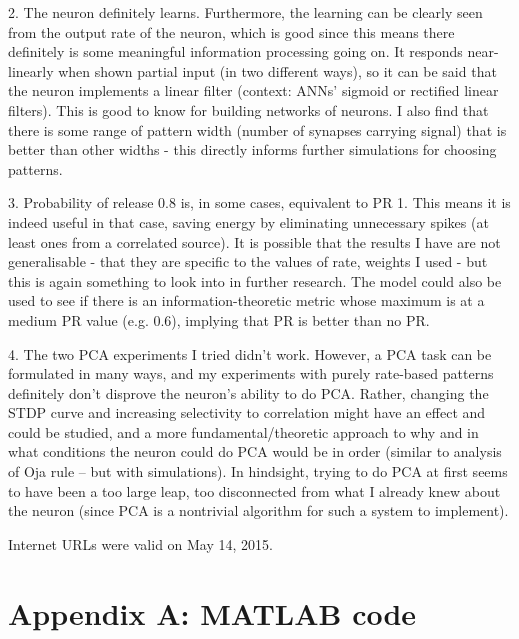 \documentclass[a4paper,12pt]{report}
\theoremstyle{definition}
\begin{document}
2. The neuron definitely learns. Furthermore, the learning can be clearly seen from the output rate of the neuron, which is good since this means there definitely is some meaningful information processing going on. It responds near-linearly when shown partial input (in two different ways), so it can be said that the neuron implements a linear filter (context: ANNs' sigmoid or rectified linear filters). This is good to know for building networks of neurons.
I also find that there is some range of pattern width (number of synapses carrying signal) that is better than other widths - this directly informs further simulations for choosing patterns.

3. Probability of release 0.8 is, in some cases, equivalent to PR 1. This means it is indeed useful in that case, saving energy by eliminating unnecessary spikes (at least ones from a correlated source). It is possible that the results I have are not generalisable - that they are specific to the values of  {rate, weights} I used - but this is again something to look into in further research. The model could also be used to see if there is an information-theoretic metric whose maximum is at a medium PR value (e.g. 0.6), implying that PR is better than no PR.

4. The two PCA experiments I tried didn't work. However, a PCA task can be formulated in many ways, and my experiments with purely rate-based patterns definitely don't disprove the neuron's ability to do PCA. Rather, changing the STDP curve and increasing selectivity to correlation might have an effect and could be studied, and a more fundamental/theoretic approach to why and in what conditions the neuron could do PCA would be in order (similar to analysis of Oja rule -- but with simulations). In hindsight, trying to do PCA at first seems to have been a too large leap, too disconnected from what I already knew about the neuron (since PCA is a nontrivial algorithm for such a system to implement).







Internet URLs were valid on May 14, 2015.
\newpage






\chapter*{Appendix A: MATLAB code}
\label{appendix:code}
\end{document}
